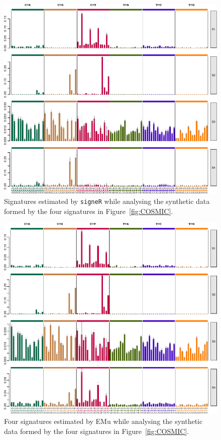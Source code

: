\documentclass[11pt]{amsart}
\theoremstyle{definition}
\begin{document}
\begin{center}
\begin{figure}
\includegraphics[width=16cm]{sfigs/Signatures_plot_simulated_21bc_com_Opp}
\caption{Signatures estimated by \texttt{signeR} while analysing the
  synthetic data  formed by the four signatures in
  Figure~\ref{fig:COSMIC}.}\label{fig:signeR}
\end{figure}
\end{center}

\begin{center}
\begin{figure}
  \includegraphics[width=16cm]{sfigs/Signature_EMu_plot}
  \caption{Four signatures estimated by EMu while
  analysing the synthetic data  formed by the four signatures in
  Figure~\ref{fig:COSMIC}.}\label{fig:EMu}
\end{figure}
\end{center}
\end{document}
